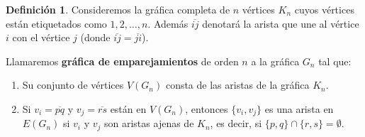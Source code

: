 \documentclass[12pt]{book}
\theoremstyle{definition}
\newtheorem{definition}[theorem]{Definición}
\newcounter{in}
\newcounter{ini}
\begin{document}
\begin{definition}
  \label{graf-emparejamientos}
  Consideremos la gráfica completa de $n$ vértices $K_{n}$ cuyos
  vértices están etiquetados como $1,2,\ldots,n$. Además
  $\overline{ij}$ denotará la arista que une al vértice $i$ con el
  vértice $j$ (donde $\overline{ij}=\overline{ji}$).
  
  Llamaremos \textbf{gráfica de emparejamientos} de orden $n$ a la
  gráfica $G_{n}$ tal que:
  
  \begin{enumerate}
  \item Su conjunto de vértices $V(G_{n})$ consta de las aristas de la gráfica
    $K_{n}$. 
  \item Si $v_{i}=\overline{pq}$ y $v_{j}=\overline{rs}$ están en
    $V(G_{n})$, entonces $\{v_{i},v_{j}\}$ es una arista en $E(G_{n})$ si $v_{i}$
    y $v_{j}$ son aristas ajenas de $K_{n}$, es decir, si $\{p,q\}\cap\{r,s\}=\emptyset$.
  \end{enumerate}
\end{definition} 
\end{document}
